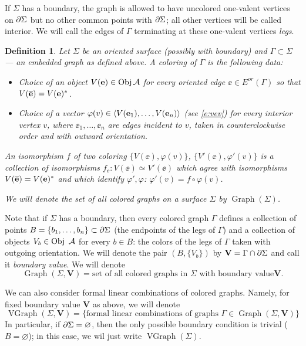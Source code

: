 \documentclass{amsart}
\newtheorem{defn}[thm]{Definition}
\DeclareMathOperator{\Obj}{Obj}
\DeclareMathOperator{\Gr}{Graph}
\DeclareMathOperator{\VGr}{VGraph}
\newcommand{\VV}{\mathbf{V}}       %
\newcommand{\Ga}{\Gamma}
\newcommand{\ph}{\varphi}
\newcommand{\Si}{\Sigma}
\begin{document}
If $\Si$ has a boundary, the graph is allowed to have uncolored one-valent
vertices on $\del \Si$ but no other common points with $\del \Si$; all
other  vertices will  be called interior.  We will  call the edges of $\Ga$
terminating at these  one-valent vertices {\em legs}.   
\begin{defn}\label{d:coloring} Let $\Si$ be an oriented surface
(possibly with boundary) and $\Ga\subset \Si$ --- an embedded graph as
defined above.  A {\em coloring} of $\Ga$ is the
following data:

  \begin{itemize}
    \item Choice of an object $V(\ee)\in \Obj \A$ for every oriented edge
        $\ee\in E^{or}(\Ga)$ so that $V(\overline{\mathbf{e}})=V(\mathbf{e})^*$.
    \item Choice of a vector $\ph(v)\in \<V(\ee_1),\dots,V(\ee_n)\>$ 
      (see \eqref{e:vev})  for    every interior vertex $v$, where 
      $\ee_1, \dots, \ee_n$ are edges incident to $v$, taken in counterclockwise 
      order and with outward orientation. %
\end{itemize}

An {\em isomorphism} $f$ of two coloring $\{V(\ee), \ph(v)\}$, $\{V'(\ee), \ph'(v)\}$ is a collection of isomorphisms $f_\ee\colon V(\ee)\simeq 
V'(\ee)$ which  agree  with isomorphisms $V(\overline{\mathbf{e}})=V(\mathbf{e})^*$ and which 
identify $\ph', \ph$:  $\ph'(v)=f\circ\ph(v)$. 

We will denote the set of all colored graphs on a surface $\Si$ by
$\Gr(\Si)$.
\end{defn}


Note that if $\Si$ has a boundary, then every colored graph $\Ga$ defines
a collection of points $B=\{b_1,\dots, b_n\}\subset \del \Si$ (the
endpoints of the legs of $\Ga$) and a collection of objects $V_b\in \Obj\
\A$ for every $b \in B$: the colors of the legs of $\Ga$ taken with
outgoing orientation. We will denote the pair $(B, \{V_b\})$ by
$\VV=\Ga\cap \del\Si$ and call it {\em boundary value}. We will denote  
$$
\Gr(\Si, \VV)=\text{set of all colored graphs in $\Si$ with boundary value
} \VV.
$$ 


We can also consider formal linear combinations of colored graphs. Namely,
for fixed boundary value $\VV$ as above, we will denote 
\begin{equation}\label{e:vgr}
\VGr(\Si,\VV)=\{\text{formal linear combinations of graphs }\Ga\in
\Gr(\Si,\VV)\}
\end{equation}
In particular, if $\del \Si=\varnothing$, then the only possible boundary
condition is trivial ($B=\varnothing$); in this case, we wil just write
$\VGr(\Si)$. 
\end{document}
